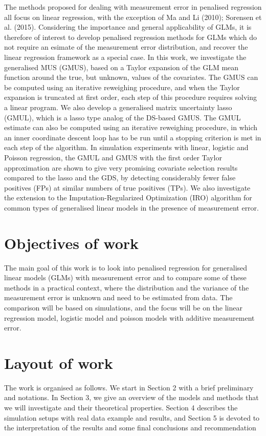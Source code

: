 \documentclass[a4paper,12pt,openany]{report}
\theoremstyle{plain}
\theoremstyle{plain}
\theoremstyle{plain}
\theoremstyle{plain}
\theoremstyle{plain}
\theoremstyle{plain}
\theoremstyle{plain}
\theoremstyle{plain}
\theoremstyle{plain}
\theoremstyle{plain}
\theoremstyle{plain}
\theoremstyle{plain}
\begin{document}
The methods proposed for dealing with measurement error in penalised regression all
focus on linear regression, with the exception of Ma and Li (2010); Sorensen et al. (2015).
Considering the importance and general applicability of GLMs, it is therefore of interest
to develop penalised regression methods for GLMs which do not require an esimate of the
measurement error distribution, and recover the linear regression framework as a special
case. In this work, we investigate the generalised MUS (GMUS), based on a Taylor expansion
of the GLM mean function around the true, but unknown, values of the covariates. The
GMUS can be computed using an iterative reweighing procedure, and when the Taylor
expansion is truncated at first order, each step of this procedure requires solving a linear
program. We also develop a generalised matrix uncertainty lasso (GMUL), which is a lasso type analog of the DS-based GMUS. The GMUL estimate can also be computed using an
iterative reweighing procedure, in which an inner coordinate descent loop has to be run
until a stopping criterion is met in each step of the algorithm. In simulation experiments
with linear, logistic and Poisson regression, the GMUL and GMUS with the first order Taylor
approximation are shown to give very promising covariate selection results compared to
the lasso and the GDS, by detecting considerably fewer false positives (FPs) at similar
numbers of true positives (TPs). We also investigate the extension to the Imputation-Regularized Optimization (IRO) algorithm for common types of generalised linear models in the presence of measurement error.

\section{Objectives of work}
The main goal of this work is to look into penalised regression for generalised linear models (GLMs) with measurement error
and to compare some of these methods in a practical context, where the distribution and
the variance of the measurement error is unknown and need to be estimated from data.
The comparison will be based on simulations, and the focus will be on the linear
regression model, logistic model and poisson models with additive measurement error.
\section{Layout of work}
The work is organised as follows. We start in Section 2 with a brief preliminary and notations. In Section 3, we give an overview of the models and methods that we will investigate and
their theoretical properties. Section 4 describes the simulation setups with real data example and results, and Section 5 is devoted to the interpretation of the results
and some final conclusions and recommendation
\end{document}
